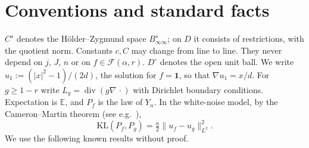 \documentclass[11pt]{article}
\theoremstyle{definition}
\theoremstyle{remark}
\newcommand{\E}{\mathbb E}
\newcommand{\one}{\mathbf 1}
\newcommand{\Fc}{\mathcal F}
\newcommand{\dv}{\operatorname{div}}
\newcommand{\KL}{\mathrm{KL}}
\newcommand{\Dint}{D^{\circ}}
\begin{document}
\section{Conventions and standard facts}\label{sec:facts}

$C^s$ denotes the H\"older--Zygmund space $B^s_{\infty\infty}$; on $D$ it consists of restrictions, with the quotient norm. Constants $c,C$ may change from line to line. They never depend on $j$, $J$, $n$ or on $f\in\Fc(\alpha,r)$. $\Dint$ denotes the open unit ball. We write $u_1:=(|x|^2-1)/(2d)$, the solution for $f=\one$, so that $\nabla u_1=x/d$. For $g\ge 1-r$ write $L_g=\dv(g\nabla\,\cdot)$ with Dirichlet boundary conditions. Expectation is $\E$, and $P_f$ is the law of $Y_n$. In the white-noise model, by the Cameron--Martin theorem (see e.g.\ \cite{GN16}),
\[
\KL(P_f,P_g)=\tfrac n2\|u_f-u_g\|_{L^2}^2 .
\]
We use the following known results without proof.
\end{document}

